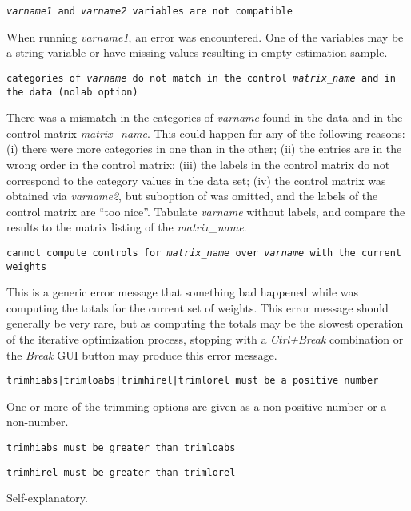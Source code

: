     \noindent
    {\tt {\it varname1} and {\it varname2} variables are not compatible}

    \morehang
    When running  {\it varname1}\stcmd{)},
    an error was encountered. One of the variables may be a string variable
    or have missing values resulting in empty estimation sample.

    \noindent
    {\tt categories of {\it varname} do not match in the control {\it matrix{\_}name}
    and in the data (nolab option)}

    \morehang
    There was a mismatch in the categories of {\it varname} found in the data
    and in the control matrix {\it matrix{\_}name}. This could happen for any of the
    following reasons: (i) there were more categories in one than in the other;
    (ii) the entries are in the wrong order in the control matrix; (iii) the labels
    in the control matrix do not correspond to the category values in the data set;
    (iv) the control matrix was obtained via 
    {\it varname2}\stcmd{)}, but  suboption
    of  was omitted, and the labels of the control matrix are
    ``too nice''. Tabulate {\it varname} without labels, and compare the results
    to the matrix listing of the {\it matrix{\_}name}.

    \noindent
    {\tt cannot compute controls for {\it matrix{\_}name} over
    {\it varname} with the current weights}

    \morehang
    This is a generic error message that something bad happened while
     was computing the totals for the current set of weights.
    This error message should generally be very rare, but as computing
    the totals may be the slowest operation of the iterative optimization
    process, stopping  with a {\it Ctrl+Break} combination or
    the {\it Break} GUI button may produce this error message.

    \noindent
    {\tt trimhiabs|trimloabs|trimhirel|trimlorel must be a positive number}

    \morehang
    One or more of the trimming options are given as a non-positive number
    or a non-number.

    \noindent
    {\tt trimhiabs must be greater than trimloabs}

    \noindent
    {\tt trimhirel must be greater than trimlorel}

    \morehang
    Self-explanatory.

